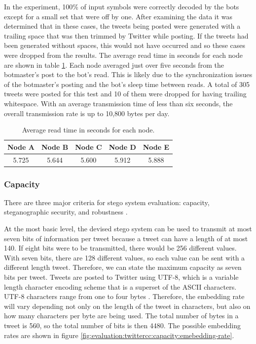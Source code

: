 In the experiment, 100\% of input symbols were correctly decoded by the bots
except for a small set that were off by one.  After examining the data it was
determined that in these cases, the tweets being posted were generated with
a trailing space that was then trimmed by Twitter while posting.  If the tweets
had been generated without spaces, this would not have occurred and so these
cases were dropped from the results.  The average read time in seconds for
each node are shown in table \ref{tab:evaluation:twittercc:emulab:average-read}.
Each node averaged just over five seconds from the botmaster's post to the
bot's read.  This is likely due to the synchronization issues of the botmaster's
posting and the bot's sleep time between reads.  A total of 305 tweets were posted
for this test and 10 of them were dropped for having trailing whitespace.  With
an average transmission time of less than six seconds, the overall transmission
rate is up to 10,800 bytes per day.

\begin{table}
\centering
\begin{tabular}{|c|c|c|c|c|}
    \hline
    Node A & Node B & Node C & Node D & Node E \\
    \hline
    5.725  & 5.644  & 5.600  & 5.912  & 5.888 \\
    \hline
\end{tabular}
\caption{Average read time in seconds for each node.}
\label{tab:evaluation:twittercc:emulab:average-read}
\end{table}

\subsubsection{Capacity}
\label{subsec:evaluation:twittercc:capacity}

There are three major criteria
for stego system evaluation: capacity, steganographic security, and
robustness \cite{steganalysis}.

At the most basic level, the devised stego system can be used to transmit
at most seven bits of information per tweet because a tweet can have a length of
at most 140.  If eight bits were to be transmitted, there would be 256 different
values.  With seven bits, there are 128 different values, so each value can be
sent with a different length tweet.  Therefore, we can state the maximum capacity
as seven bits per tweet.  Tweets are posted to Twitter using UTF-8, which is
a variable length character encoding scheme that is a superset of the ASCII
characters.  UTF-8 characters range from one to four bytes \cite{rfc3629}.
Therefore, the embedding rate will vary depending not only on the length
of the tweet in characters, but also on how many characters per byte are being
used.  The total number of bytes in a tweet is 560, so the total number of
bits is then 4480.  The possible embedding rates are shown in figure
\ref{fig:evaluation:twittercc:capacity:emebedding-rate}.

